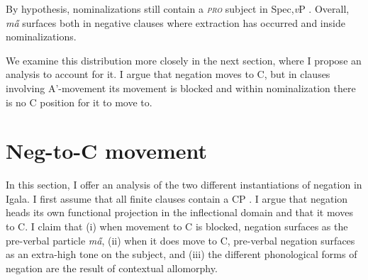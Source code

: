 \documentclass[output=paper,colorlinks,citecolor=brown,
]{langscibook}
\begin{document}
By hypothesis, nominalizations still contain a \textit{\textsc{pro}} subject in Spec,\textit{v}P \citep[][among others]{abney1987english, kratzer1996severing}. %
Overall, \textit{m\H{a}} surfaces both in negative clauses where extraction has occurred and inside nominalizations. 

We examine this distribution more closely in the next section, where I propose an analysis to account for it. I argue that negation moves to C, but in clauses involving A'-movement its movement is blocked and within nominalization there is no C position for it to move to.

\section{Neg-to-C movement}\label{analysis}


%



In this section, I offer an analysis of the two different instantiations of negation in Igala. I first assume that all finite clauses contain a CP \citep{chomsky2007approaching}. I argue that negation heads its own functional projection in the inflectional domain and that it moves to C\xhead{}. I claim that (i) when movement to C is blocked, negation surfaces as the pre-verbal particle \textit{m\H{a}}, (ii) when it does move to C, pre-verbal negation surfaces as an extra-high tone on the subject, and (iii) the different phonological forms of negation are the result of contextual allomorphy. 
\end{document}
